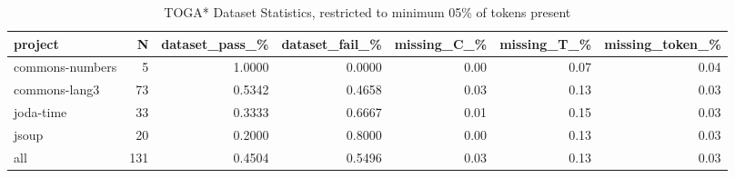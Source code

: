 \begin{table*}
\centering
\caption{TOGA* Dataset Statistics, restricted to minimum 05\% of tokens present}
\label{tab:toga_stats_05}
\begin{tabular}{lrrrrrr}
\toprule
         project &    N &  dataset\_pass\_\% &  dataset\_fail\_\% &  missing\_C\_\% &  missing\_T\_\% &  missing\_token\_\% \\
\midrule
 commons-numbers &    5 &          1.0000 &          0.0000 &         0.00 &         0.07 &             0.04 \\
   commons-lang3 &   73 &          0.5342 &          0.4658 &         0.03 &         0.13 &             0.03 \\
       joda-time &   33 &          0.3333 &          0.6667 &         0.01 &         0.15 &             0.03 \\
           jsoup &   20 &          0.2000 &          0.8000 &         0.00 &         0.13 &             0.03 \\
             all &  131 &          0.4504 &          0.5496 &         0.03 &         0.13 &             0.03 \\
\bottomrule
\end{tabular}
\end{table*}

